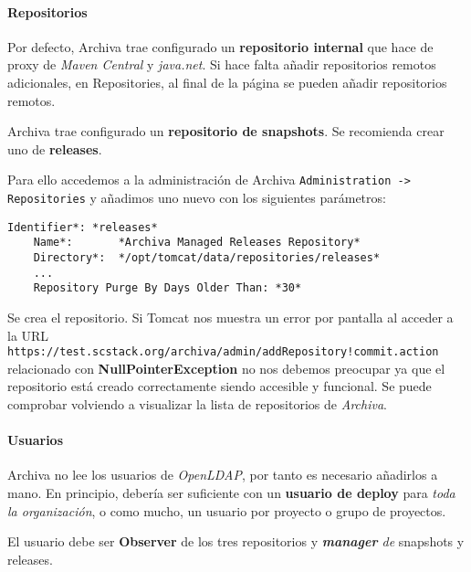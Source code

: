 \paragraph{Repositorios}

\par Por defecto, Archiva trae configurado un \textbf{repositorio internal} que hace de proxy de \emph{Maven Central} y \emph{java.net}. Si hace falta añadir repositorios remotos adicionales, en Repositories, al final de la página se pueden añadir repositorios remotos.

\par Archiva trae configurado un \textbf{repositorio de snapshots}. Se recomienda crear uno de \textbf{releases}.

\par Para ello accedemos a la administración de Archiva \texttt{Administration -\textgreater{} Repositories} y añadimos uno nuevo con los siguientes parámetros:

\lstset{style=bashbasico}
\begin{lstlisting}[frame=trbl]
    Identifier*: *releases*
    Name*:       *Archiva Managed Releases Repository*
    Directory*:  */opt/tomcat/data/repositories/releases*
    ...
    Repository Purge By Days Older Than: *30*
\end{lstlisting}

\par Se crea el repositorio. Si Tomcat nos muestra un error por pantalla al acceder a la URL \texttt{https://test.scstack.org/archiva/admin/addRepository!commit.action} relacionado con \textbf{NullPointerException} no nos debemos preocupar ya que el repositorio está creado correctamente siendo accesible y funcional. Se puede comprobar volviendo a visualizar la lista de repositorios de \emph{Archiva}.

\paragraph{Usuarios}

\par Archiva no lee los usuarios de \emph{OpenLDAP}, por tanto es necesario añadirlos a mano. En principio, debería ser suficiente con un \textbf{usuario de deploy} para \emph{toda la organización}, o como mucho, un usuario por proyecto o grupo de proyectos.

\par El usuario debe ser \textbf{Observer} de los tres repositorios y \emph{\textbf{manager} de} snapshots y releases.

